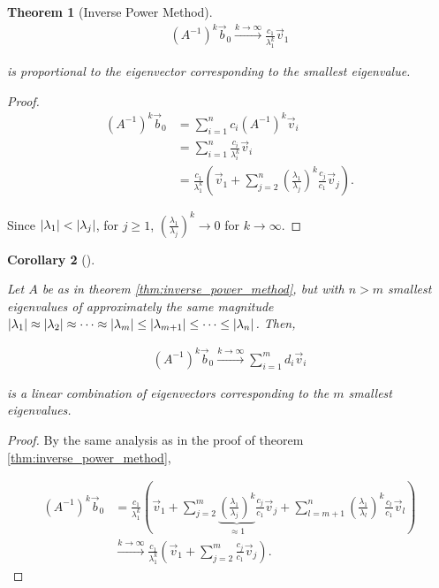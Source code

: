 \documentclass{article}
\theoremstyle{plain} %
\newtheorem{theorem}{Theorem}[section]
\newtheorem{corollary}[theorem]{Corollary}
\theoremstyle{convention} %
\theoremstyle{remark} %
\numberwithin{equation}{section}
\begin{document}
\begin{appendix}
\begin{theorem}[Inverse Power Method]
\begin{align*}
  (A^{-1})^k \vec{b}_0 \xrightarrow{k\rightarrow\infty} \frac{c_1}{\lambda_1^k} \vec{v}_1
\end{align*}

is proportional to the eigenvector corresponding to the smallest eigenvalue.

\end{theorem}

\begin{proof}

\begin{align*}
  (A^{-1})^k \vec{b}_0 &= \sum_{i=1}^n c_i (A^{-1})^k \vec{v}_i\\
  &= \sum_{i=1}^n \frac{c_i}{\lambda_i^{k}} \vec{v}_i\\
  &= \frac{c_1}{\lambda_1^k} \left( \vec{v}_1 + \sum_{j=2}^n \left(\frac{\lambda_1}{\lambda_j}\right)^k \frac{c_j}{c_1} \vec{v}_j \right).
\end{align*}

Since $\abs{\lambda_1} < \abs{\lambda_j}$, for $j \ge 1$, $\left(\frac{\lambda_1}{\lambda_j}\right)^k \to 0$ for $k \to \infty$.

\end{proof}

\begin{corollary}[]

\label{cor:inverse_power_method}

Let $A$ be as in theorem \ref{thm:inverse_power_method}, but with $n > m$ smallest eigenvalues of approximately the same magnitude $\abs{\lambda_1} \approx \abs{\lambda_2} \approx \dots \approx \abs{\lambda_{m}} \le \abs{\lambda_{m+1}} \leq \dots \leq \abs{\lambda_n}$. Then,

\begin{align*}
  (A^{-1})^k \vec{b}_0 \xrightarrow{k\rightarrow\infty} \sum_{i=1}^m d_i \vec{v}_i
\end{align*}

is a linear combination of eigenvectors corresponding to the $m$ smallest eigenvalues.

\end{corollary}

\begin{proof}

By the same analysis as in the proof of theorem \ref{thm:inverse_power_method},

\begin{align*}
  (A^{-1})^k \vec{b}_0 &= \frac{c_1}{\lambda_1^k} \left( \vec{v}_1 + \sum_{j=2}^m \underbrace{\left(\frac{\lambda_1}{\lambda_j}\right)^k}_{\approx 1} \frac{c_j}{c_1} \vec{v}_j + \sum_{l=m+1}^n \left(\frac{\lambda_1}{\lambda_l}\right)^k \frac{c_l}{c_1} \vec{v}_l \right) \\
  &\xrightarrow{k\rightarrow\infty} \frac{c_1}{\lambda_1^k} \left( \vec{v}_1 + \sum_{j=2}^m \frac{c_j}{c_1} \vec{v}_j \right).
\end{align*}


\end{proof}
\end{appendix}
\end{document}
